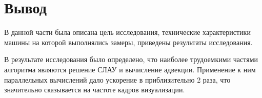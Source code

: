 \section*{Вывод}
В данной части была описана цель исследования, технические характеристики машины на которой выполнялись замеры, приведены результаты исследования.

В результате исследования было определено, что наиболее трудоемкими частями алгоритма являются решение СЛАУ и вычисление адвекции. Применение к ним параллельных вычислений дало ускорение в приблизительно 2 раза, что значительно сказывается на частоте кадров визуализации.


